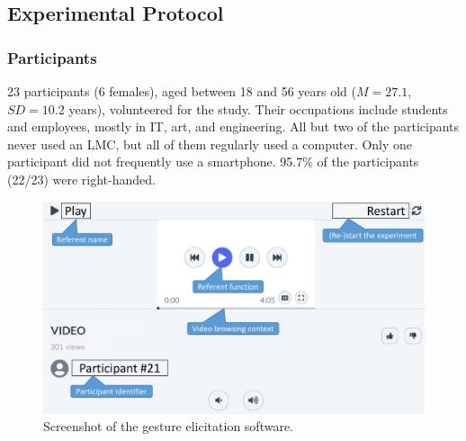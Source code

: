 \subsection{Experimental Protocol} \label{app:lui-ges:protocol}
\subsubsection{Participants} 
23 participants (6 females), aged between 18 and 56 years old ($M{=} 27.1$, $SD{=}10.2$ years), volunteered for the study. Their occupations include students and employees, mostly in IT, art, and engineering. All but two of the participants never used an LMC, but all of them regularly used a computer. Only one participant did not frequently use a smartphone. 95.7\% of the participants (22/23) were right-handed.


\begin{figure}[h!]
    \centering
    \includegraphics[width=.95\textwidth]{Figures/App-LUIGES/ges-ui.pdf}
    \vspace{-8pt}
    \caption{Screenshot of the gesture elicitation software.}
    \label{fig:lui-ges:real}
    \vspace{-6pt}
\end{figure}

